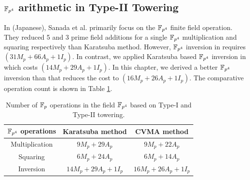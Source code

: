\subsection{\texorpdfstring{$\mathbb{F}_{p^4}$ }{}arithmetic in Type-II Towering}   
In \cite{cvma_sanada} (Japanese), Sanada et al. primarily focus on the $\mathbb{F}_{p^4}$ finite field operation.
They reduced 5 and 3 prime field additions for a single $\mathbb{F}_{p^4}$ multiplication and squaring respectively than Karatsuba method.
However, $\mathbb{F}_{p^4}$ inversion in \cite{cvma_sanada} requires $(31 M_p +66A_p+1I_p)$.
In contrast, we applied Karatsuba based $\mathbb{F}_{p^4}$ inversion in \cite{INDOCRYPT:KNGDNK17} which costs $(14 M_p +29A_p+1I_p)$.
In this chapter, we derived a better $\mathbb{F}_{p^4}$ inversion than \cite{cvma_sanada} that reduces the cost to $(16M_p+26A_p+1I_p)$. 
The comparative operation count is shown in Table \ref{tab_fp4_operation}.
\renewcommand{\baselinestretch}{1.5}
\begin{table}[ht]
	\centering
		\caption{Number of ${\mathbb{F}}_{p}$ operations in the field $\mathbb{F}_{p^4}$ based on Type-I and Type-II towering.}
		\label{tab_fp4_operation}
	\begin{tabular}{|c|c|c|}
		\hline
		$\mathbb{F}_{p^4}  $ operations & Karatsuba method               & CVMA  method \\
		\hline
		Multiplication    & $9M_p + 29A_p$     & $9M_p+22A_p$       \\ \hline
		Squaring          & $6M_p+24A_p$       & $6M_p+14A_p$       \\ \hline
		Inversion         & $14M_p+29A_p+1I_p$ & $16M_p+26A_p+1I_p$ \\ \hline
	\end{tabular}
\end{table}
\renewcommand{\baselinestretch}{1.0}
